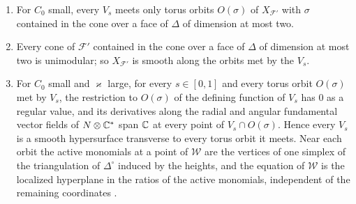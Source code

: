 \begin{lemma}\label{lem:Ufan}
\begin{enumerate}
\item For $C_0$ small, every $V_s$ meets only torus orbits $O(\sigma)$ of $X_{\mathcal F'}$ with $\sigma$ contained in the cone
over a face of $\Delta$ of dimension at most two.
\item Every cone of $\mathcal F'$ contained in the cone over a face of $\Delta$ of dimension at most two is unimodular; so
$X_{\mathcal F'}$ is smooth along the orbits met by the $V_s$.
\item For $C_0$ small and $\varkappa$ large, for every $s\in[0,1]$ and every torus orbit $O(\sigma)$ met by $V_s$, the restriction to
$O(\sigma)$ of the defining function of $V_s$ has $0$ as a regular value, and its derivatives along the radial and angular
fundamental vector fields of $N\otimes\mathbb C^*$ span $\mathbb C$ at every point of $V_s\cap O(\sigma)$. Hence every $V_s$ is a smooth
hypersurface transverse to every torus orbit it meets. Near each orbit the active monomials at a point of $\mathscr W$ are the vertices
of one simplex of the triangulation of $\Delta^\circ$ induced by the heights, and the equation of $\mathscr W$ is the localized
hyperplane \cite[Def.~3.2]{Ya16} in the ratios of the active monomials, independent of the remaining coordinates
\cite[Thm.~3.9(2),(3)]{Ya16}.
\end{enumerate}
\end{lemma}
